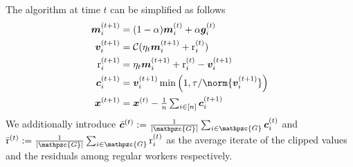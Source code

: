 \documentclass{article}
\newcommand{\gset}{\ensuremath{{\mathpzc{G}}}}
\begin{document}
The algorithm at time $t$ can be simplified as follows
\begin{align}
  \mm_i^{(t+1)} & = (1-\alpha) \mm_i^{(t)} + \alpha \gg_i^{(t)}                 \label{eq:m}     \\
  \vv_i^{(t+1)} & = \cC(\eta_t\mm_i^{(t+1)} + \rr_i^{(t)})                          \label{eq:v} \\
  \rr_i^{(t+1)} & = \eta_t\mm_i^{(t+1)} + \rr_i^{(t)} - \vv_i^{(t+1)}               \label{eq:r} \\
  \cc_i^{(t+1)} & = \vv_i^{(t+1)}\min\left(1,\tau/\norm{\vv_i^{(t+1)}}\right) \label{eq:c}       \\
  \xx^{(t+1)}   & =\xx^{(t)}- \tfrac{1}{n}\tsum_{i\in[n]}\cc_i^{(t+1)} \label{eq:x}
\end{align}
We additionally introduce $\bar{\cc}^{(t)}:=\tfrac{1}{|\gset|}\tsum_{i\in\gset}\cc_i^{(t)}$ and $\bar{\rr}^{(t)}:=\tfrac{1}{|\gset|}\tsum_{i\in\gset}\rr_i^{(t)}$ as the average iterate of the clipped values and the residuals among regular workers respectively.
\end{document}
